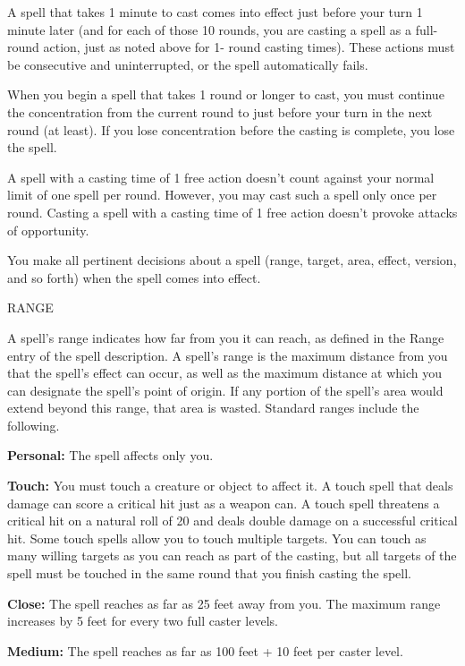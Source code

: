 \documentclass{article}
\begin{document}
A spell that takes 1 minute to cast comes into effect just before your turn 1 minute 
later (and for each of those 10 rounds, you are casting a spell as a full-round 
action, just as noted above for 1- round casting times). These actions must be 
consecutive and uninterrupted, or the spell automatically fails.

When you begin a spell that takes 1 round or longer to cast, you must continue 
the concentration from the current round to just before your turn in the next round 
(at least). If you lose concentration before the casting is complete, you lose 
the spell.

A spell with a casting time of 1 free action doesn't count against your normal 
limit of one spell per round. However, you may cast such a spell only once per 
round. Casting a spell with a casting time of 1 free action doesn't provoke attacks 
of opportunity.

You make all pertinent decisions about a spell (range, target, area, effect, version, 
and so forth) when the spell comes into effect.

\vspace{12pt}
RANGE

A spell's range indicates how far from you it can reach, as defined in the Range 
entry of the spell description. A spell's range is the maximum distance from you 
that the spell's effect can occur, as well as the maximum distance at which you 
can designate the spell's point of origin. If any portion of the spell's area would 
extend beyond this range, that area is wasted. Standard ranges include the following.

\textbf{Personal:} The spell affects only you.

\textbf{Touch:} You must touch a creature or object to affect it. A touch spell 
that deals damage can score a critical hit just as a weapon can. A touch spell 
threatens a critical hit on a natural roll of 20 and deals double damage on a successful 
critical hit. Some touch spells allow you to touch multiple targets. You can touch 
as many willing targets as you can reach as part of the casting, but all targets 
of the spell must be touched in the same round that you finish casting the spell.

\textbf{Close:} The spell reaches as far as 25 feet away from you. The maximum 
range increases by 5 feet for every two full caster levels.

\textbf{Medium:} The spell reaches as far as 100 feet + 10 feet per caster level.
\end{document}
